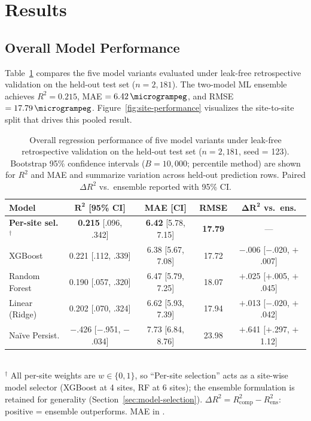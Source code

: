 \documentclass[toxins,article,submit,moreauthors]{Definitions/mdpi}
\begin{document}
\section{Results}
\label{sec:results}

\subsection{Overall Model Performance}
\label{sec:results-overall}

Table~\ref{tab:model-comparison} compares the five model variants evaluated under leak-free retrospective validation on the held-out test set ($n = 2{,}181$). The two-model ML ensemble achieves $R^2 = 0.215$, MAE $= \SI{6.42}{\microgrampeg}$, and RMSE $= \SI{17.79}{\microgrampeg}$. Figure~\ref{fig:site-performance} visualizes the site-to-site split that drives this pooled result.

\begin{table}[H]
\caption{Overall regression performance of five model variants under leak-free retrospective validation on the held-out test set ($n = 2{,}181$, seed = 123). Bootstrap 95\% confidence intervals ($B = 10{,}000$; percentile method) are shown for $R^2$ and MAE and summarize variation across held-out prediction rows. Paired $\Delta R^2$ vs.\ ensemble reported with 95\% CI.}
\label{tab:model-comparison}
\centering\scriptsize
\begin{tabular*}{\linewidth}{@{\extracolsep{\fill}}lcccc}
\toprule
\textbf{Model} & $\boldsymbol{R^2}$ \textbf{[95\% CI]} & \textbf{MAE [CI]} & \textbf{RMSE} & $\boldsymbol{\Delta R^2}$ \textbf{vs.\ ens.} \\
\midrule
\textbf{Per-site sel.}$^{\dagger}$ & \textbf{0.215} [.096, .342] & \textbf{6.42} [5.78, 7.15] & \textbf{17.79} & --- \\
XGBoost          & 0.221 [.112, .339] & 6.38 [5.67, 7.08] & 17.72 & $-$.006 [$-$.020, $+$.007] \\
Random Forest    & 0.190 [.057, .320] & 6.47 [5.79, 7.25] & 18.07 & $+$.025 [$+$.005, $+$.045] \\
Linear (Ridge)   & 0.202 [.070, .324] & 6.62 [5.93, 7.39] & 17.94 & $+$.013 [$-$.020, $+$.042] \\
Na\"ive Persist. & $-$.426 [$-$.951, $-$.034] & 7.73 [6.84, 8.76] & 23.98 & $+$.641 [$+$.297, $+$1.12] \\
\bottomrule
\end{tabular*}
\vspace{0.3em}\\
\footnotesize{$^\dagger$ All per-site weights are $w \in \{0,1\}$, so ``Per-site selection'' acts as a site-wise model selector (XGBoost at 4 sites, RF at 6 sites); the ensemble formulation is retained for generality (Section~\ref{sec:model-selection}). $\Delta R^2 = R^2_{\text{comp}} - R^2_{\text{ens}}$: positive = ensemble outperforms. MAE in \si{\microgrampeg}.}
\end{table}
\end{document}
